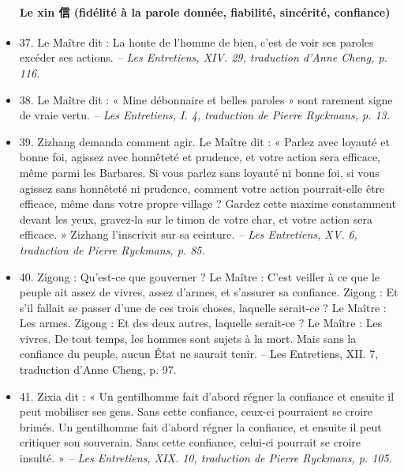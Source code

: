 \begin{itemize}
\paragraph{Le xin 信 (fidélité à la parole donnée, fiabilité, sincérité, confiance)}  
\item 37. \newline Le Maître dit : La honte de l’homme de bien, c’est de voir ses paroles excéder ses actions. \textit{\small  -- Les Entretiens, XIV. 29, traduction d’Anne Cheng, p. 116.  }
\item 38. \newline Le Maître dit : « Mine débonnaire et belles paroles » sont rarement signe de vraie vertu.  \textit{\small -- Les Entretiens, I. 4, traduction de Pierre Ryckmans, p. 13.  }
\item 39. \newline Zizhang demanda comment agir. \newline Le Maître dit : « Parlez avec loyauté et bonne foi, agissez avec honnêteté et prudence, et votre action sera efficace, même parmi les Barbares. Si vous parlez sans loyauté ni bonne foi, si vous agissez sans honnêteté ni prudence, comment votre action pourrait-elle être efficace, même dans votre propre village ? Gardez cette maxime constamment devant les yeux, gravez-la sur le timon de votre char, et votre action sera efficace. » \newline Zizhang l’inscrivit sur sa ceinture.  \textit{\small -- Les Entretiens, XV. 6, traduction de Pierre Ryckmans, p. 85.  }
\item 40. \newline Zigong : Qu’est-ce que gouverner ? \newline Le Maître : C’est veiller à ce que le peuple ait assez de vivres, assez d’armes, et s’assurer sa confiance. \newline Zigong : Et s’il fallait se passer d’une de ces trois choses, laquelle serait-ce ? \newline Le Maître : Les armes. \newline Zigong : Et des deux autres, laquelle serait-ce ? \newline Le Maître : Les vivres. De tout temps, les hommes sont sujets à la mort. Mais sans la confiance du peuple, aucun État ne saurait tenir. -- Les Entretiens, XII. 7, traduction d’Anne Cheng, p. 97.  
\item 41. \newline Zixia dit : « Un gentilhomme fait d’abord régner la confiance et ensuite il peut mobiliser ses gens. Sans cette confiance, ceux-ci pourraient se croire brimés. Un gentilhomme fait d’abord régner la confiance, et ensuite il peut critiquer son souverain. Sans cette confiance, celui-ci pourrait se croire insulté. » \textit{\small -- Les Entretiens, XIX. 10, traduction de Pierre Ryckmans, p. 105. }

 
\end{itemize}